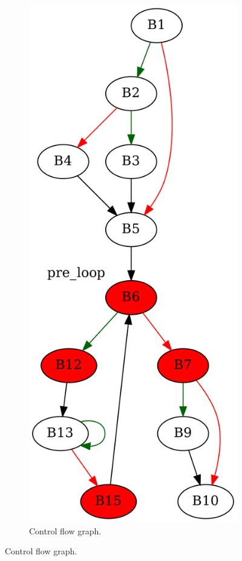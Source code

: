 \documentclass[aspectratio=1610]{beamer}
\begin{document}
\begin{frame}[noframenumbering]
\begin{figure}[htbp]
\begin{subfigure}[b]{0.50\textwidth}
			\includegraphics[height=0.6\paperheight]{inc/methods/interval/example/sample/f_0003a.png}
			\caption{Control flow graph.}
		\end{subfigure}
	\end{figure}
\end{frame}
\end{document}
